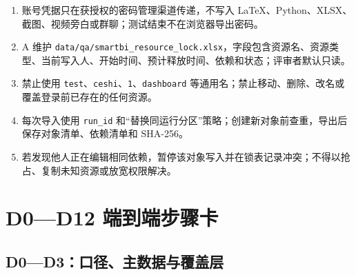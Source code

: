 \documentclass[UTF8,fontset=windows,12pt,openany]{ctexbook}
\newcommand{\Field}[1]{{\small\nolinkurl{#1}}}
\newcommand{\File}[1]{{\small\begingroup\urlstyle{same}\nolinkurl{#1}\endgroup}}
\begin{document}
\begin{enumerate}
  \item 账号凭据只在获授权的密码管理渠道传递，不写入 LaTeX、Python、XLSX、截图、视频旁白或群聊；测试结束不在浏览器导出密码。
  \item A 维护 \File{data/qa/smartbi_resource_lock.xlsx}，字段包含资源名、资源类型、当前写入人、开始时间、预计释放时间、依赖和状态；评审者默认只读。
  \item 禁止使用 \Field{test}、\Field{ceshi}、\Field{1}、\Field{dashboard} 等通用名；禁止移动、删除、改名或覆盖登录前已存在的任何资源。
  \item 每次导入使用 \Field{run_id} 和“替换同运行分区”策略；创建新对象前查重，导出后保存对象清单、依赖清单和 SHA-256。
  \item 若发现他人正在编辑相同依赖，暂停该对象写入并在锁表记录冲突；不得以抢占、复制未知资源或放宽权限解决。
\end{enumerate}

\part{D0—D12 端到端步骤卡}

\chapter{D0—D3：口径、主数据与覆盖层}
\end{document}
